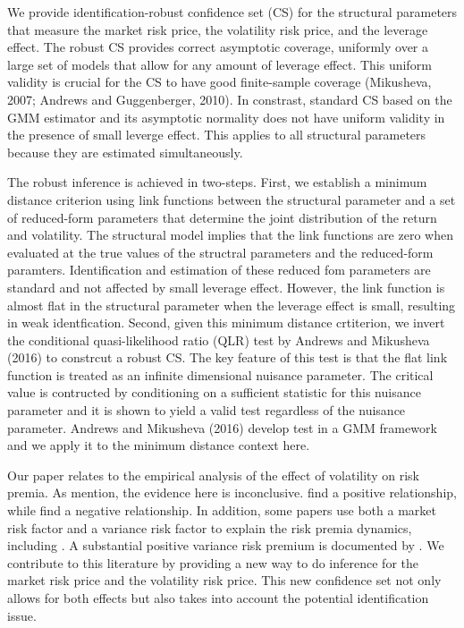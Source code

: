 \documentclass[11pt, letterpaper, twoside]{article}
\begin{document}
We provide identification-robust confidence set (CS) for the structural parameters that measure the market risk price, the volatility risk price, and the leverage effect. 
The robust CS provides correct asymptotic coverage, uniformly over a large set of models that allow for any amount of leverage effect. This uniform validity is crucial for the CS to have good finite-sample coverage (Mikusheva, 2007; Andrews and Guggenberger, 2010). In constrast, standard CS based on the GMM estimator and its asymptotic normality does not have uniform validity in the presence of small leverge effect. This applies to all structural parameters because they are estimated simultaneously.


The robust inference is achieved in two-steps. First, we establish a minimum distance criterion using link functions between the structural parameter and a set of reduced-form parameters that determine the joint distribution of the return and volatility. The structural model implies that the link functions are zero when evaluated at the true values of the structral parameters and the reduced-form paramters. Identification and estimation of these reduced fom parameters are standard and not affected by small leverage effect. However, the link function is almost flat in the structural parameter when the leverage effect is small, resulting in weak identfication. Second, given this minimum distance crtiterion, we invert the conditional quasi-likelihood ratio (QLR) test by Andrews and Mikusheva (2016) to constrcut a robust CS. The key feature of this test is that the flat link function is treated as an infinite dimensional nuisance parameter. The critical value is contructed by conditioning on a sufficient statistic for this nuisance parameter and it is shown to yield a valid test regardless of the nuisance parameter. Andrews and Mikusheva (2016) develop test in a GMM framework and we apply it to the minimum distance context here.



Our paper relates to the empirical analysis of the effect of volatility on risk premia. As \textcite{lettau2010measuring} mention,  the evidence here is inconclusive. \textcites{bollerslev1988capital, harvey1989timevarying, ghysels2005there, bali2006there, ludvigson2007empirical} find a positive relationship, while \textcites{campbell1987stock, breen1989economic, pagan1991nonparametric, whitelaw1994time, brandt2004relationship} find a negative relationship. In addition, some papers use both a market risk factor and a variance risk factor to explain the risk premia dynamics, including \textcites {christoffersen2013capturing, feunou2014risk, dewbecker2017price}. A substantial positive variance risk premium is documented by \textcites {bollerslev2008risk, drechsler2011whats}. We contribute to this literature by providing a new way to do inference for the market risk price and the volatility risk price. This new confidence set not only allows for both effects but also takes into account the potential identification issue.
\end{document}
